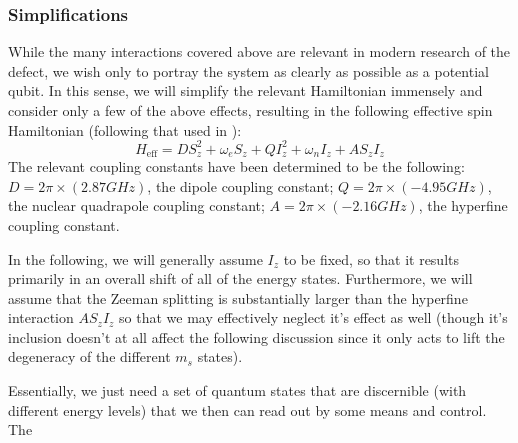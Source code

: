 \documentclass[10pt,a4paper]{article}
\begin{document}
\begin{multicols}{2}
\subsubsection{Simplifications}
While the many interactions covered above are relevant in modern research of the defect, we wish only to portray the system as clearly as possible as a potential qubit. In this sense, we will simplify the relevant Hamiltonian immensely and consider only a few of the above effects, resulting in the following effective spin Hamiltonian (following that used in \cite{PhysRevLett.129.100501}):
$$
H_{\text{eff}} = DS_z^2 + \omega_eS_z + QI_z^2 +\omega_nI_z + AS_zI_z
$$
The relevant coupling constants have been determined to be the following:
$D=2\pi\times (2.87 GHz)$, the dipole coupling constant;
$Q=2\pi\times (-4.95 GHz)$, the nuclear quadrapole coupling constant;
$A=2\pi\times (-2.16 GHz)$, the hyperfine coupling constant.

In the following, we will generally assume $I_z$ to be fixed, so that it results primarily in an overall shift of all of the energy states. Furthermore, we will assume that the Zeeman splitting is substantially larger than the hyperfine interaction $AS_zI_z$ so that we may effectively neglect it's effect as well (though it's inclusion doesn't at all affect the following discussion since it only acts to lift the degeneracy of the different $m_s$ states).

Essentially, we just need a set of quantum states that are discernible (with different energy levels) that we then can read out by some means and control. The 


\end{multicols}
\end{document}
